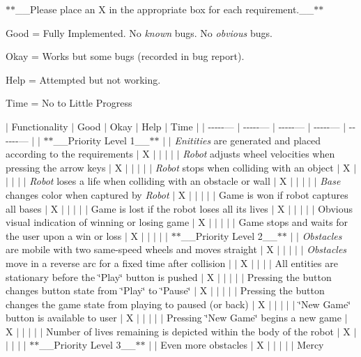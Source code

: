 $\ast$$\ast$\+\_\+\+\_\+\+Please place an \textquotesingle{}X\textquotesingle{} in the appropriate box for each requirement.\+\_\+\+\_\+$\ast$$\ast$
\begin{DoxyItemize}
\item Good = Fully Implemented. No {\itshape known} bugs. No {\itshape obvious} bugs.
\item Okay = Works but some bugs (recorded in bug report).
\item Help = Attempted but not working.
\item Time = No to Little Progress
\end{DoxyItemize}

$\vert$ Functionality $\vert$ Good $\vert$ Okay $\vert$ Help $\vert$ Time $\vert$ $\vert$ -\/-\/-\/-\/-\/--- $\vert$ -\/-\/-\/-\/-\/--- $\vert$ -\/-\/-\/-\/-\/--- $\vert$ -\/-\/-\/-\/-\/--- $\vert$ -\/-\/-\/-\/-\/-\/--- $\vert$ $\vert$ $\ast$$\ast$\+\_\+\+\_\+\+Priority Level 1\+\_\+\+\_\+$\ast$$\ast$ $\vert$ $\vert$ {\itshape Enitities} are generated and placed according to the requirements $\vert$ X $\vert$ $\vert$ $\vert$ $\vert$ $\vert$ {\itshape Robot} adjusts wheel velocities when pressing the arrow keys $\vert$ X $\vert$ $\vert$ $\vert$ $\vert$ $\vert$ {\itshape Robot} stops when colliding with an object $\vert$ X $\vert$ $\vert$ $\vert$ $\vert$ $\vert$ {\itshape Robot} loses a life when colliding with an obstacle or wall $\vert$ X $\vert$ $\vert$ $\vert$ $\vert$ $\vert$ {\itshape Base} changes color when captured by {\itshape Robot} $\vert$ X $\vert$ $\vert$ $\vert$ $\vert$ $\vert$ Game is won if robot captures all bases $\vert$ X $\vert$ $\vert$ $\vert$ $\vert$ $\vert$ Game is lost if the robot loses all its lives $\vert$ X $\vert$ $\vert$ $\vert$ $\vert$ $\vert$ Obvious visual indication of winning or losing game $\vert$ X $\vert$ $\vert$ $\vert$ $\vert$ $\vert$ Game stops and waits for the user upon a win or loss $\vert$ X $\vert$ $\vert$ $\vert$ $\vert$ $\vert$ $\ast$$\ast$\+\_\+\+\_\+\+Priority Level 2\+\_\+\+\_\+$\ast$$\ast$ $\vert$ $\vert$ {\itshape Obstacles} are mobile with two same-\/speed wheels and moves straight $\vert$ X $\vert$ $\vert$ $\vert$ $\vert$ $\vert$ {\itshape Obstacles} move in a reverse arc for a fixed time after collision $\vert$ $\vert$ X $\vert$ $\vert$ $\vert$ $\vert$ All entities are stationary before the \char`\"{}\+Play\char`\"{} button is pushed $\vert$ X $\vert$ $\vert$ $\vert$ $\vert$ $\vert$ Pressing the button changes button state from \char`\"{}\+Play\char`\"{} to \char`\"{}\+Pause\char`\"{} $\vert$ X $\vert$ $\vert$ $\vert$ $\vert$ $\vert$ Pressing the button changes the game state from playing to paused (or back) $\vert$ X $\vert$ $\vert$ $\vert$ $\vert$ $\vert$ \char`\"{}\+New Game\char`\"{} button is available to user $\vert$ X $\vert$ $\vert$ $\vert$ $\vert$ $\vert$ Pressing \char`\"{}\+New Game\char`\"{} begins a new game $\vert$ X $\vert$ $\vert$ $\vert$ $\vert$ $\vert$ Number of lives remaining is depicted within the body of the robot $\vert$ X $\vert$ $\vert$ $\vert$ $\vert$ $\vert$ $\ast$$\ast$\+\_\+\+\_\+\+Priority Level 3\+\_\+\+\_\+$\ast$$\ast$ $\vert$ $\vert$ Even more obstacles $\vert$ X $\vert$ $\vert$ $\vert$ $\vert$ $\vert$ Mercy 